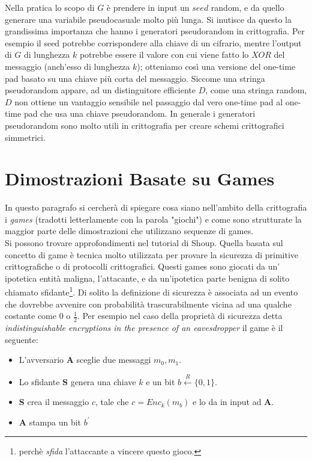 \documentclass[a4paper,openright,twoside,12pt]{report}
\begin{document}
Nella pratica lo scopo di $G$ \`e prendere in input un $seed$ random, e da quello generare una variabile pseudocasuale molto pi\`u lunga. Si inutisce da questo la grandissima
importanza che hanno i generatori pseudorandom in crittografia. Per esempio il seed potrebbe corrispondere alla chiave di un cifrario, mentre l'output di $G$ di lunghezza $k$ potrebbe
essere il valore con cui viene fatto lo $XOR$ del messaggio (anch'esso di lunghezza $k$); otteniamo cos\`i una versione del one-time pad basato su una chiave pi\`u corta del messaggio.
Siccome una stringa pseudorandom appare, ad un distinguitore efficiente $D$, come una stringa random, $D$ non ottiene un vantaggio sensibile nel passaggio dal vero one-time pad
al one-time pad che usa una chiave pseudorandom. In generale i generatori pseudorandom sono molto utili in crittografia per creare schemi crittografici simmetrici.

\section{Dimostrazioni Basate su Games}
In questo paragrafo si cercher\`a di spiegare cosa siano nell'ambito della crittografia i \emph{games} (tradotti letterlamente con la parola "giochi") e come sono strutturate la maggior parte delle dimostrazioni
che utilizzano sequenze di games.\\Si possono trovare approfondimenti nel tutorial di Shoup\cite{shoup}.
Quella basata sul concetto di game \`e tecnica molto utilizzata per provare la sicurezza di primitive crittografiche o di protocolli crittografici.
Questi games sono giocati da un' ipotetica entit\`a maligna, l'attacante, e da un'ipotetica parte benigna di solito chiamato sfidante\footnote{perch\`e \emph{sfida} l'attaccante a 
vincere questo gioco.}. Di solito la definizione di sicurezza \`e associata ad un evento che dovrebbe avvenire con probabilit\`a trascurabilmente vicina ad una qualche costante come 
$0$ o $\frac{1}{2}$. Per esempio nel caso della propriet\`a di sicurezza detta \emph{indistinguishable encryptions in the presence of an eavesdropper} il game \`e il seguente:
\begin{itemize}
 \item L'avversario \textbf{A} sceglie due messaggi $m_0, m_1$.
 \item Lo sfidante \textbf{S} genera una chiave $k$ e un bit $b \xleftarrow{R} \{0,1\}$.
 \item \textbf{S} crea il messaggio $c$, tale che $c= Enc_k(m_b)$ e lo da in input ad \textbf{A}.
 \item \textbf{A} stampa un bit $b^{'}$
\end{itemize}
\end{document}
